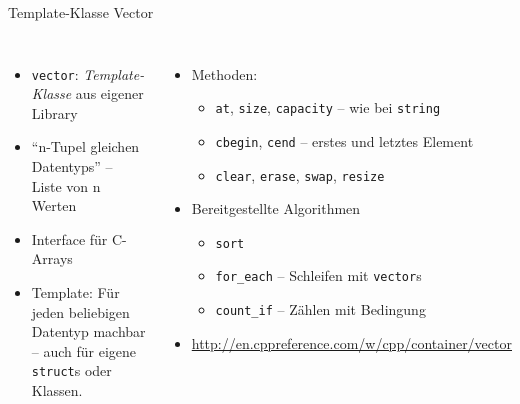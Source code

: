 \begin{frame}{Template-Klasse Vector}
%
\begin{columns}[T]
\begin{itemize}
\item \texttt{vector}: \emph{Template-Klasse} aus eigener Library
\item \enquote{n-Tupel gleichen Datentyps} -- Liste von n Werten
\item Interface für C-Arrays
\item Template: Für jeden beliebigen Datentyp machbar -- auch für eigene \texttt{struct}s oder Klassen.
\end{itemize}
%
\begin{itemize}
\item Methoden:
	\begin{itemize}
	\item \texttt{at}, \texttt{size}, \texttt{capacity} -- wie bei \texttt{string}
	\item \texttt{cbegin}, \texttt{cend} -- erstes und letztes Element
	\item \texttt{clear}, \texttt{erase}, \texttt{swap}, \texttt{resize}
	\end{itemize}
\item Bereitgestellte Algorithmen
	\begin{itemize}
	\item \texttt{sort}
	\item \texttt{for\_each} -- Schleifen mit \texttt{vector}s
	\item \texttt{count\_if} -- Zählen mit Bedingung
	\end{itemize}
\item \url{http://en.cppreference.com/w/cpp/container/vector}
\end{itemize}
\end{columns}
%
\end{frame}



